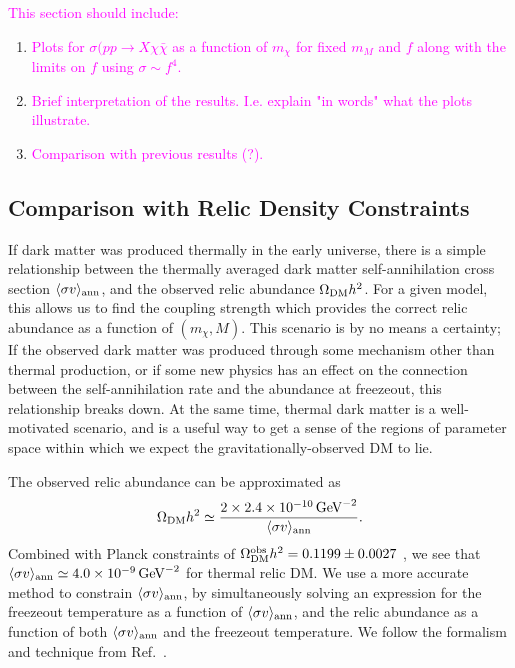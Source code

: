 \begin{flushleft}
\textcolor{magenta}{This section should include:}
\begin{enumerate}
\item \textcolor{magenta}{Plots for $\sigma(pp \rightarrow X \chi \bar{\chi}$ as a function of $m_{\chi}$ for fixed $m_{M}$ and $f$ along with the limits on $f$ using $\sigma \sim f^{4}$.}
\item \textcolor{magenta}{Brief interpretation of the results. I.e. explain "in words" what the plots illustrate.}
\item \textcolor{magenta}{Comparison with previous results (?).}
\end{enumerate}
\end{flushleft}

\subsection{Comparison with Relic Density Constraints}


If dark matter was produced thermally in the early universe, there is a simple relationship between the thermally averaged dark matter self-annihilation cross section $\langle\sigma v\rangle_{\rm ann}$, and the observed relic abundance $\Omega_{\rm DM}h^2$. For a given model, this allows us to find the coupling strength which provides the correct relic abundance as a function of $(m_\chi, M)$. 
%
This scenario is by no means a certainty; If the observed dark matter was produced through some mechanism other than thermal production, or if some new physics has an effect on the connection between the self-annihilation rate and the abundance at freezeout, this relationship breaks down. At the same time, thermal dark matter is a well-motivated scenario, and is a useful way to get a sense of the regions of parameter space within which we expect the gravitationally-observed DM to lie. 

The observed relic abundance can be approximated as
%
\begin{equation}
\Omega_{\rm DM}h^2\simeq \frac{2\times2.4\times 10^{-10}\,{\rm GeV}^{-2}}{\langle\sigma v\rangle_{\rm ann}}.
\label{simplerelic}
\end{equation}
%
Combined with Planck constraints of $\Omega_{\rm DM}^{\rm obs}h^2=0.1199\pm0.0027$ \cite{Ade:2013zuv}, we see that $\langle\sigma v\rangle_{\rm ann}\simeq 4.0\times 10^{-9}\,{\rm GeV}^{-2}$ for thermal relic DM. 
%
We use a more accurate method to constrain $\langle\sigma v\rangle_{\rm ann}$, by simultaneously solving an expression for the freezeout temperature as a function of $\langle\sigma v\rangle_{\rm ann}$, and the relic abundance as a function of both $\langle\sigma v\rangle_{\rm ann}$ and the freezeout temperature. We follow the formalism and technique from Ref.~\cite{Busoni:2014gta}.

